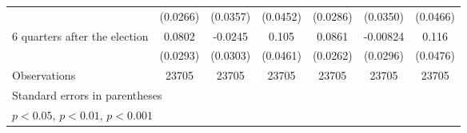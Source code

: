 \begin{table}[!ht]
\begin{tabular}{l*{6}{c}}
                    &    (0.0266)         &    (0.0357)         &    (0.0452)         &    (0.0286)         &    (0.0350)         &    (0.0466)         \\
[1em]
 6 quarters after the election&      0.0802\sym{**} &     -0.0245         &       0.105\sym{*}  &      0.0861\sym{***}&    -0.00824         &       0.116\sym{*}  \\
                    &    (0.0293)         &    (0.0303)         &    (0.0461)         &    (0.0262)         &    (0.0296)         &    (0.0476)         \\
\hline
Observations        &       23705         &       23705         &       23705         &       23705         &       23705         &       23705         \\
\hline\hline
\multicolumn{7}{l}{\footnotesize Standard errors in parentheses}\\
\multicolumn{7}{l}{\footnotesize \sym{*} \(p<0.05\), \sym{**} \(p<0.01\), \sym{***} \(p<0.001\)}\\
\end{tabular}
\end{table}
